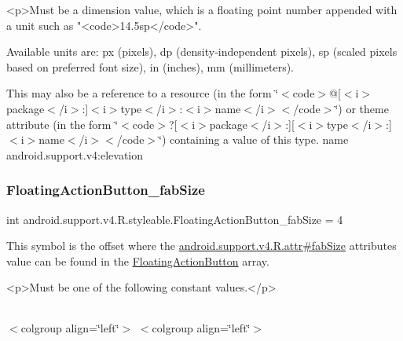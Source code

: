\begin{DoxyVerb}      <p>Must be a dimension value, which is a floating point number appended with a unit such as "<code>14.5sp</code>".
\end{DoxyVerb}
 Available units are\+: px (pixels), dp (density-\/independent pixels), sp (scaled pixels based on preferred font size), in (inches), mm (millimeters). 

This may also be a reference to a resource (in the form \char`\"{}$<$code$>$@\mbox{[}$<$i$>$package$<$/i$>$\+:\mbox{]}$<$i$>$type$<$/i$>$\+:$<$i$>$name$<$/i$>$$<$/code$>$\char`\"{}) or theme attribute (in the form \char`\"{}$<$code$>$?\mbox{[}$<$i$>$package$<$/i$>$\+:\mbox{]}\mbox{[}$<$i$>$type$<$/i$>$\+:\mbox{]}$<$i$>$name$<$/i$>$$<$/code$>$\char`\"{}) containing a value of this type.  name android.\+support.\+v4\+:elevation \mbox{\label{classandroid_1_1support_1_1v4_1_1R_1_1styleable_aa59e0b00cd1893f6504e167cb1003ffd}} 
\subsubsection{\texorpdfstring{Floating\+Action\+Button\+\_\+fab\+Size}{FloatingActionButton\_fabSize}}
{\footnotesize\ttfamily int android.\+support.\+v4.\+R.\+styleable.\+Floating\+Action\+Button\+\_\+fab\+Size = 4\hspace{0.3cm}{\ttfamily [static]}}

This symbol is the offset where the \hyperlink{classandroid_1_1support_1_1v4_1_1R_1_1attr_a2f96544f9044e6ee88ee775bc42fae22}{android.\+support.\+v4.\+R.\+attr\#fab\+Size} attribute\textquotesingle{}s value can be found in the \hyperlink{classandroid_1_1support_1_1v4_1_1R_1_1styleable_ad3363bb32f8e5e0dde36b5e32146816b}{Floating\+Action\+Button} array.

\begin{DoxyVerb}      <p>Must be one of the following constant values.</p>
\end{DoxyVerb}
 \tabulinesep=1mm
\begin{longtabu} spread 0pt [c]{*{0}{|X[-1]}|}
\hline
\end{longtabu}
$<$colgroup align=\char`\"{}left\char`\"{}$>$ $<$colgroup align=\char`\"{}left\char`\"{}$>$ 

